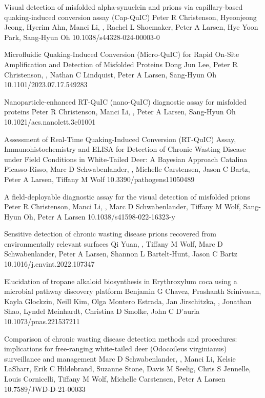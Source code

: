 \documentclass{resume}
\begin{document}
\begin{samepage}
            {Visual detection of misfolded alpha-synuclein and prions via capillary-based quaking-induced conversion assay (Cap-QuIC)}
            {Peter R Christenson, Hyeonjeong Jeong, Hyerim Ahn, Manci Li, \me{}, Rachel L Shoemaker, Peter A Larsen, Hye Yoon Park, Sang-Hyun Oh}
            {10.1038/s44328-024-00003-0}

            {Microfluidic Quaking-Induced Conversion (Micro-QuIC) for Rapid On-Site Amplification and Detection of Misfolded Proteins}
            {Dong Jun Lee, Peter R Christenson, \me{}, Nathan C Lindquist, Peter A Larsen, Sang-Hyun Oh}
            {10.1101/2023.07.17.549283}

            {Nanoparticle-enhanced RT-QuIC (nano-QuIC) diagnostic assay for misfolded proteins}
            {Peter R Christenson, Manci Li, \me{}, Peter A Larsen, Sang-Hyun Oh}
            {10.1021/acs.nanolett.3c01001}

            {Assessment of Real-Time Quaking-Induced Conversion (RT-QuIC) Assay, Immunohistochemistry and ELISA for Detection of Chronic Wasting Disease under Field Conditions in White-Tailed Deer: A Bayesian Approach}
            {Catalina Picasso-Risso, Marc D Schwabenlander, \me{}, Michelle Carstensen, Jason C Bartz, Peter A Larsen, Tiffany M Wolf}
            {10.3390/pathogens11050489}

            {A field-deployable diagnostic assay for the visual detection of misfolded prions}
            {Peter R Christenson, Manci Li, \me{}, Marc D Schwabenlander, Tiffany M Wolf, Sang-Hyun Oh, Peter A Larsen}
            {10.1038/s41598-022-16323-y}

            {Sensitive detection of chronic wasting disease prions recovered from environmentally relevant surfaces}
            {Qi Yuan, \me{}, Tiffany M Wolf, Marc D Schwabenlander, Peter A Larsen, Shannon L Bartelt-Hunt, Jason C Bartz}
            {10.1016/j.envint.2022.107347}

            {Elucidation of tropane alkaloid biosynthesis in Erythroxylum coca using a microbial pathway discovery platform}
            {Benjamin G Chavez, Prashanth Srinivasan, Kayla Glockzin, Neill Kim, Olga Montero Estrada, Jan Jirschitzka, \me{}, Jonathan Shao, Lyndel Meinhardt, Christina D Smolke, John C D’auria}
            {10.1073/pnas.221537211}

            {Comparison of chronic wasting disease detection methods and procedures: implications for free-ranging white-tailed deer (Odocoileus virginianus) surveillance and management}
            {Marc D Schwabenlander, \me{}, Manci Li, Kelsie LaSharr, Erik C Hildebrand, Suzanne Stone, Davis M Seelig, Chris S Jennelle, Louis Cornicelli, Tiffany M Wolf, Michelle Carstensen, Peter A Larsen}
            {10.7589/JWD-D-21-00033}
            

\end{samepage}
\end{document}
